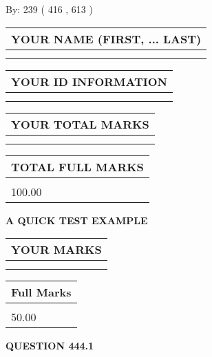 \documentclass[12pt]{article}
\begin{document}
   
\hspace{1.0in} By: 
 239 ( 416 ,  613 )
   
   
   
   
\newpage 
\setcounter{page}{ 
   444001 } 
   
   
   
   
\noindent\begin{tabular}{|l|}
\hline
YOUR NAME (FIRST, ... LAST)  \\
\hline
 \\ 
 \\ 
\hline
\end{tabular}
\hspace{0.05in} \begin{tabular}{|l|}
\hline
 YOUR   ID   INFORMATION  \\
\hline
 \\ 
 \\ 
\hline
\end{tabular}
   
   
\vspace{0.2in}\noindent\begin{tabular}{|l|}
\hline
YOUR TOTAL MARKS  \\
\hline
 \\ 
 \\ 
\hline
\end{tabular}
\hspace{0.05in} \begin{tabular}{|l|}
\hline
TOTAL FULL MARKS  \\
\hline
 \\ 
100.00 \\
\hline
\end{tabular}
   
   
 \vspace{0.2in}
{\LARGE {\textbf{ A QUICK TEST EXAMPLE}}}
   
   
  
\vspace{0.2in}
  
\noindent\begin{tabular}{|l|}
\hline
 YOUR MARKS  \\
\hline
 \\ 
 \\ 
\hline
\end{tabular}
\hspace{0.05in} \begin{tabular}{|l|}
\hline
 Full Marks  \\
\hline
 \\ 
50.00 \\
\hline
\end{tabular}
{\textbf{\Large{QUESTION
444.1 
}}}
  
\end{document}

